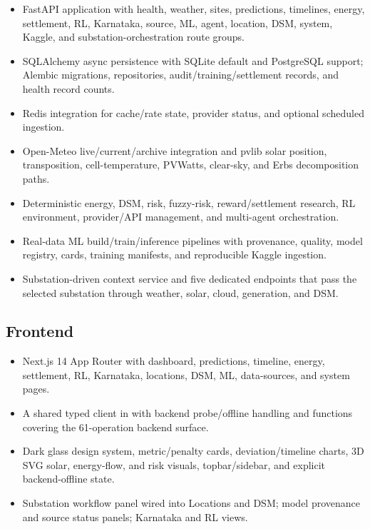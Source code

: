 \documentclass[10pt,a4paper]{article}
\begin{document}
\begin{itemize}
  \item FastAPI application with health, weather, sites, predictions, timelines, energy,
        settlement, RL, Karnataka, source, ML, agent, location, DSM, system, Kaggle, and
        substation-orchestration route groups.
  \item SQLAlchemy async persistence with SQLite default and PostgreSQL support; Alembic migrations,
        repositories, audit/training/settlement records, and health record counts.
  \item Redis integration for cache/rate state, provider status, and optional scheduled ingestion.
  \item Open-Meteo live/current/archive integration and pvlib solar position, transposition,
        cell-temperature, PVWatts, clear-sky, and Erbs decomposition paths.
  \item Deterministic energy, DSM, risk, fuzzy-risk, reward/settlement research, RL environment,
        provider/API management, and multi-agent orchestration.
  \item Real-data ML build/train/inference pipelines with provenance, quality, model registry,
        cards, training manifests, and reproducible Kaggle ingestion.
  \item Substation-driven context service and five dedicated endpoints that pass the selected
        substation through weather, solar, cloud, generation, and DSM.
\end{itemize}

\subsection{Frontend}

\begin{itemize}
  \item Next.js 14 App Router with dashboard, predictions, timeline, energy, settlement, RL, Karnataka,
        locations, DSM, ML, data-sources, and system pages.
  \item A shared typed client in  with backend probe/offline handling and
        functions covering the 61-operation backend surface.
  \item Dark glass design system, metric/penalty cards, deviation/timeline charts, 3D SVG solar,
        energy-flow, and risk visuals, topbar/sidebar, and explicit backend-offline state.
  \item Substation workflow panel wired into Locations and DSM; model provenance and source status
        panels; Karnataka and RL views.
\end{itemize}
\end{document}
